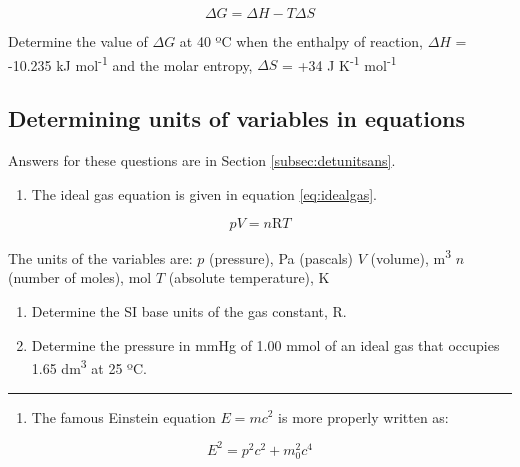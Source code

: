 \documentclass[
]{book}
\providecommand{\tightlist}{%
  \setlength{\itemsep}{0pt}\setlength{\parskip}{0pt}}
\begin{document}
\begin{equation}
\Delta G = \Delta H - T \Delta S
\label{eq:gibbs}
\end{equation}

Determine the value of \(\Delta G\) at 40 ºC when the enthalpy of reaction, \(\Delta H\) = -10.235 kJ mol\textsuperscript{-1} and the molar entropy, \(\Delta S\) = +34 J K\textsuperscript{-1} mol\textsuperscript{-1}

\hypertarget{subsec:detunits}{%
\subsection{Determining units of variables in equations}\label{subsec:detunits}}

Answers for these questions are in Section \ref{subsec:detunitsans}.

\begin{enumerate}
\def\labelenumi{\arabic{enumi}.}
\tightlist
\item
  The ideal gas equation is given in equation \eqref{eq:idealgas}.
\end{enumerate}

\begin{equation}
pV = n\textrm{R}T
\label{eq:idealgas}
\end{equation}

The units of the variables are:
\(p\) (pressure), Pa (pascals)
\(V\) (volume), m\textsuperscript{3}
\(n\) (number of moles), mol
\(T\) (absolute temperature), K

\begin{enumerate}
\def\labelenumi{\alph{enumi}.}
\item
  Determine the SI base units of the gas constant, R.
\item
  Determine the pressure in mmHg of 1.00 mmol of an ideal gas that occupies 1.65 dm\textsuperscript{3} at 25 ºC.
\end{enumerate}

\begin{center}\rule{0.5\linewidth}{0.5pt}\end{center}

\begin{enumerate}
\def\labelenumi{\arabic{enumi}.}
\setcounter{enumi}{1}
\tightlist
\item
  The famous Einstein equation \(E=mc^2\) is more properly written as:
\end{enumerate}

\begin{equation*}
E^2 = p^2 c^2 + m_0^2 c^4
\end{equation*}
\end{document}

